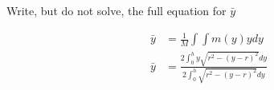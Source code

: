 Write, but do not solve, the full equation for $\bar{y}$

\begin{solution}
\begin{align*}
    \bar{y} &= \frac{1}{M}\int\int m(y) y dy \\
    \bar{y} &= \frac{2\int_{0}^{h}y \sqrt{r^2 - \left(y - r\right)^2} dy}{2\int_{0}^{h} \sqrt{r^2 - \left(y - r\right)^2} dy}
\end{align*}
\end{solution}